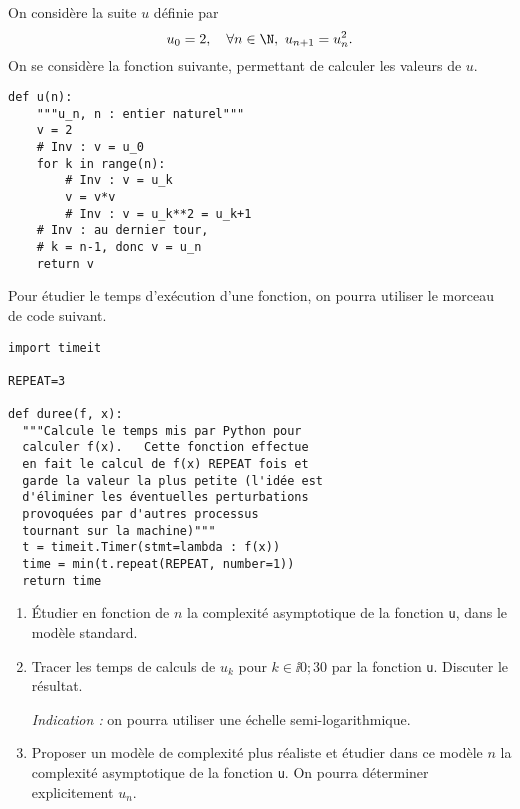 \exer{}
\setcounter{numques}{0}

On considère la suite $u$ définie par 
\begin{equation*}
  u_0 = 2,\quad \forall n \in \N,~ u_{n+1} = u_n^2.
\end{equation*}
On se considère la fonction suivante, permettant de calculer les valeurs de $u$. 
\begin{lstlisting}
def u(n):
    """u_n, n : entier naturel"""
    v = 2
    # Inv : v = u_0
    for k in range(n):
        # Inv : v = u_k
        v = v*v
        # Inv : v = u_k**2 = u_k+1
    # Inv : au dernier tour, 
    # k = n-1, donc v = u_n
    return v
\end{lstlisting}

Pour étudier le temps d'exécution d'une fonction, on pourra utiliser le morceau de code suivant. 
\begin{lstlisting}
import timeit

REPEAT=3

def duree(f, x):
  """Calcule le temps mis par Python pour 
  calculer f(x).   Cette fonction effectue 
  en fait le calcul de f(x) REPEAT fois et
  garde la valeur la plus petite (l'idée est
  d'éliminer les éventuelles perturbations 
  provoquées par d'autres processus
  tournant sur la machine)"""
  t = timeit.Timer(stmt=lambda : f(x))
  time = min(t.repeat(REPEAT, number=1))
  return time
\end{lstlisting}

\begin{enumerate}
  \item Étudier en fonction de $n$ la complexité asymptotique de la fonction \texttt{u}, dans le modèle standard.
  \item Tracer les temps de calculs de $u_k$ pour $k \in \ii{0;30}$ par la fonction \texttt{u}. Discuter le résultat.
  
    \emph{Indication :} on pourra utiliser une échelle semi-logarithmique.
  \item Proposer un modèle de complexité plus réaliste et étudier dans ce modèle $n$ la complexité asymptotique de la fonction \texttt{u}.
    On pourra déterminer explicitement $u_n$. 
\end{enumerate}
